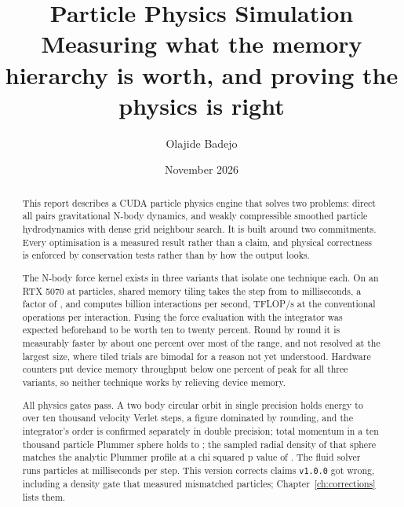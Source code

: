 \documentclass[11pt,a4paper]{report}
\title{\textbf{Particle Physics Simulation}\\[0.4em]
       \large Measuring what the memory hierarchy is worth, and proving the
       physics is right}
\author{Olajide Badejo}
\date{November 2026}
\begin{document}
\maketitle

\begin{abstract}
\noindent
This report describes a CUDA particle physics engine that solves two problems:
direct all pairs gravitational N-body dynamics, and weakly compressible
smoothed particle hydrodynamics with dense grid neighbour search. It is built
around two commitments. Every optimisation is a measured result rather than a
claim, and physical correctness is enforced by conservation tests rather than
by how the output looks.

The N-body force kernel exists in three variants that isolate one technique
each. On an RTX 5070 at \LadderMaxN{} particles, shared memory tiling takes the
step from \NaiveMsAtMaxN{} to \TiledMsAtMaxN{} milliseconds, a factor of
\TilingSpeedupAtMaxN{}, and computes \TiledGigaInteractionsAtMaxN{} billion
interactions per second, \TiledTflopsAtMaxN{} TFLOP/s at the conventional
\ConventionalFlopsPerInteraction{} operations per interaction. Fusing the force
evaluation with the integrator was expected beforehand to be worth ten to twenty percent.
Round by round it is measurably faster by about one percent over most of the range, and
not resolved at the largest size, where tiled trials are bimodal for a reason not yet
understood. Hardware counters put device memory throughput below one percent of peak for
all three variants, so neither technique works by relieving device memory.

All \GateCount{} physics gates pass. A two body circular orbit in single precision holds
energy to \EnergyDriftMeasured{} over ten thousand velocity Verlet steps, a figure dominated
by rounding, and the integrator's order is confirmed separately in double precision; total
momentum in a ten thousand particle
Plummer sphere holds to \MomentumDriftMeasured{}; the sampled radial density of
that sphere matches the analytic Plummer profile at a chi squared p value of
\PlummerPValue{}. The fluid solver runs \SphMaxN{} particles at
\SphMsAtMaxN{} milliseconds per step. This version corrects claims \texttt{v1.0.0} got
wrong, including a density gate that measured mismatched particles;
Chapter~\ref{ch:corrections} lists them.
\end{abstract}

\tableofcontents












\end{document}
